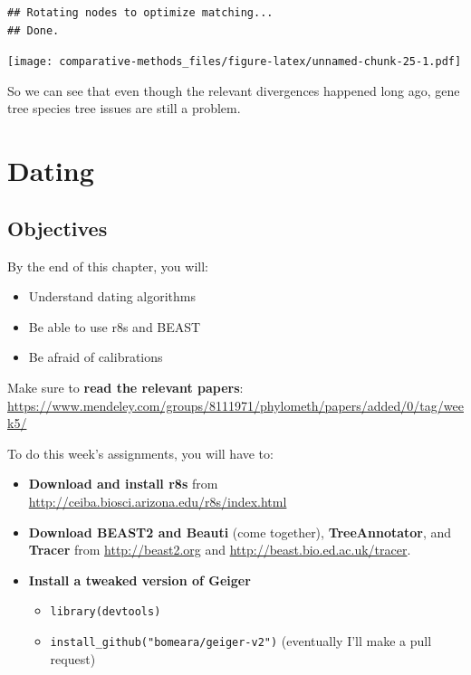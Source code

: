 \documentclass[
]{article}
\providecommand{\tightlist}{%
  \setlength{\itemsep}{0pt}\setlength{\parskip}{0pt}}
\begin{document}
\begin{verbatim}
## Rotating nodes to optimize matching...
## Done.
\end{verbatim}

\texttt{[image: comparative-methods\_files/figure-latex/unnamed-chunk-25-1.pdf]}

So we can see that even though the relevant divergences happened long ago, gene tree species tree issues are still a problem.

\hypertarget{dating}{%
\section{Dating}\label{dating}}

\hypertarget{objectives-8}{%
\subsection{Objectives}\label{objectives-8}}

By the end of this chapter, you will:

\begin{itemize}
\tightlist
\item
  Understand dating algorithms
\item
  Be able to use r8s and BEAST
\item
  Be afraid of calibrations
\end{itemize}

Make sure to \textbf{read the relevant papers}: \url{https://www.mendeley.com/groups/8111971/phylometh/papers/added/0/tag/week5/}

To do this week's assignments, you will have to:

\begin{itemize}
\tightlist
\item
  \textbf{Download and install r8s} from \url{http://ceiba.biosci.arizona.edu/r8s/index.html}
\item
  \textbf{Download BEAST2 and Beauti} (come together), \textbf{TreeAnnotator}, and \textbf{Tracer} from \url{http://beast2.org} and \url{http://beast.bio.ed.ac.uk/tracer}.
\item
  \textbf{Install a tweaked version of Geiger}

  \begin{itemize}
  \tightlist
  \item
    \texttt{library(devtools)}
  \item
    \texttt{install\_github("bomeara/geiger-v2")} (eventually I'll make a pull request)
  \end{itemize}
\end{itemize}
\end{document}
